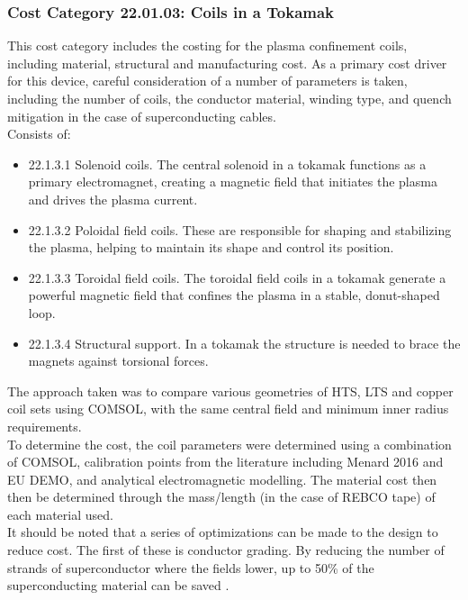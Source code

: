 \subsubsection*{Cost Category 22.01.03: Coils in a Tokamak}

This cost category includes the costing for the plasma confinement coils, including  material, structural and manufacturing cost. As a primary cost driver for this device, careful consideration of a number of parameters is taken, including the number of coils, the conductor material, winding type, and quench mitigation in the case of superconducting cables.\\

Consists of:

\begin{itemize}
    \item 22.1.3.1 Solenoid coils. The central solenoid in a tokamak functions as a primary electromagnet, creating a magnetic field that initiates the plasma and drives the plasma current.
    \item 22.1.3.2 Poloidal field coils. These are responsible for shaping and stabilizing the plasma, helping to maintain its shape and control its position.
    \item 22.1.3.3 Toroidal field coils. The toroidal field coils in a tokamak generate a powerful magnetic field that confines the plasma in a stable, donut-shaped loop.
    \item 22.1.3.4 Structural support. In a tokamak the structure is needed to brace the magnets against torsional forces.
\end{itemize}
   

The approach taken was to compare various geometries of HTS, LTS and copper coil sets using COMSOL, with the same central field and minimum inner radius requirements.\\

To determine the cost, the coil parameters were determined using a combination of COMSOL, calibration points from the literature including Menard 2016 \cite{Menard2016} and EU DEMO, and analytical electromagnetic modelling. The material cost then then be determined through the mass/length (in the case of REBCO tape) of each material used.\\

It should be noted that a series of optimizations can be made to the design to reduce cost. The first of these is conductor grading. By reducing the number of strands of superconductor where the fields lower, up to 50\% of the superconducting material can be saved \cite{uglietti2018progressing}.\\

